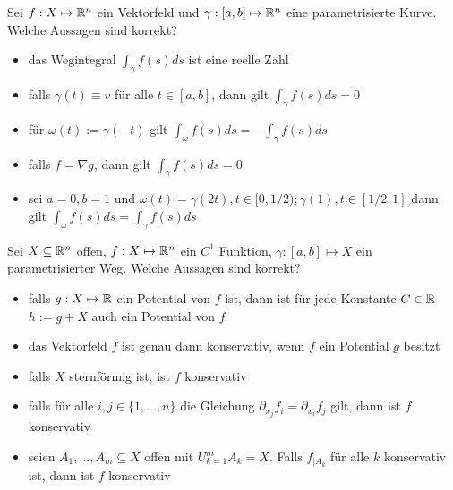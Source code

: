 \hrulefill

Sei $f: X \mapsto \mathbb{R}^n$ ein Vektorfeld und $\gamma: [a,b] \mapsto \mathbb{R}^n$ eine parametrisierte 
Kurve. Welche Aussagen sind korrekt?
\begin{itemize}
    \item[\rlap{\raisebox{0.3ex}{\hspace{0.4ex}\tiny \ding{52}}}$\square$] das Wegintegral
    $\int_\gamma f(s)ds$ ist eine reelle Zahl
    \item[\rlap{\raisebox{0.3ex}{\hspace{0.4ex}\tiny \ding{52}}}$\square$] falls $\gamma(t)
    \equiv v$ für alle $t \in [a,b]$, dann gilt $\int_\gamma f(s)ds = 0$
    \item[\rlap{\raisebox{0.3ex}{\hspace{0.4ex}\tiny \ding{52}}}$\square$] für $\omega(t)
    := \gamma(-t)$ gilt $\int_\omega f(s)ds = -\int_\gamma f(s)ds$
    \item[$\square$] falls $f = \nabla g$, dann gilt $\int_\gamma f(s)ds = 0$
    \item[\rlap{\raisebox{0.3ex}{\hspace{0.4ex}\tiny \ding{52}}}$\square$] sei $a = 0, b = 1$
    und $\omega(t) = \gamma(2t), t \in [0, 1/2); \gamma(1), t \in [1/2, 1]$ dann gilt
    $\int_\omega f(s)ds = \int_\gamma f(s)ds$
\end{itemize}

\hrulefill

Sei $X \subseteq \mathbb{R}^n$ offen, $f : X \mapsto \mathbb{R}^n$ ein $C^1$ Funktion, $\gamma: [a,b] \mapsto 
X$ ein parametrisierter Weg. Welche Aussagen sind korrekt?
\begin{itemize}
    \item[\rlap{\raisebox{0.3ex}{\hspace{0.4ex}\tiny \ding{52}}}$\square$] falls $g: X 
    \mapsto \mathbb{R}$ ein Potential von $f$ ist, dann ist für jede Konstante $C \in \mathbb{R}$ $h := g + X$
    auch ein Potential von $f$
    \item[\rlap{\raisebox{0.3ex}{\hspace{0.4ex}\tiny \ding{52}}}$\square$] das Vektorfeld $f$ 
    ist genau dann konservativ, wenn $f$ ein Potential $g$ besitzt
    \item[$\square$] falls $X$ sternförmig ist, ist $f$ konservativ
    \item[$\square$] falls für alle $i,j \in \{1, ..., n\}$ die Gleichung $\partial_{x_j}f_i
    = \partial_{x_i}f_j$ gilt, dann ist $f$ konservativ
    \item[$\square$] seien $A_1, ..., A_m \subseteq X$ offen mit $U_{k = 1}^m A_k = X$. Falls
    $f_{|A_k}$ für alle $k$ konservativ ist, dann ist $f$ konservativ
\end{itemize}


